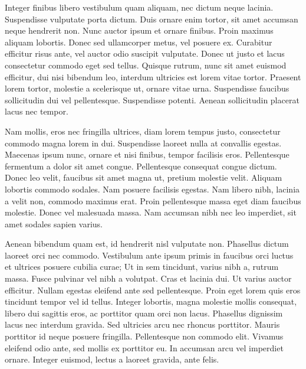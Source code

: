 \documentclass{ltjarticle}
\begin{document}
Integer finibus libero vestibulum quam aliquam, nec dictum neque lacinia. Suspendisse vulputate porta dictum. Duis ornare enim tortor, sit amet accumsan neque hendrerit non. Nunc auctor ipsum et ornare finibus. Proin maximus aliquam lobortis. Donec sed ullamcorper metus, vel posuere ex. Curabitur efficitur risus ante, vel auctor odio suscipit vulputate. Donec ut justo et lacus consectetur commodo eget sed tellus. Quisque rutrum, nunc sit amet euismod efficitur, dui nisi bibendum leo, interdum ultricies est lorem vitae tortor. Praesent lorem tortor, molestie a scelerisque ut, ornare vitae urna. Suspendisse faucibus sollicitudin dui vel pellentesque. Suspendisse potenti. Aenean sollicitudin placerat lacus nec tempor.

Nam mollis, eros nec fringilla ultrices, diam lorem tempus justo, consectetur commodo magna lorem in dui. Suspendisse laoreet nulla at convallis egestas. Maecenas ipsum nunc, ornare et nisi finibus, tempor facilisis eros. Pellentesque fermentum a dolor sit amet congue. Pellentesque consequat congue dictum. Donec leo velit, faucibus sit amet magna ut, pretium molestie velit. Aliquam lobortis commodo sodales. Nam posuere facilisis egestas. Nam libero nibh, lacinia a velit non, commodo maximus erat. Proin pellentesque massa eget diam faucibus molestie. Donec vel malesuada massa. Nam accumsan nibh nec leo imperdiet, sit amet sodales sapien varius.

Aenean bibendum quam est, id hendrerit nisl vulputate non. Phasellus dictum laoreet orci nec commodo. Vestibulum ante ipsum primis in faucibus orci luctus et ultrices posuere cubilia curae; Ut in sem tincidunt, varius nibh a, rutrum massa. Fusce pulvinar vel nibh a volutpat. Cras et lacinia dui. Ut varius auctor efficitur. Nullam egestas eleifend ante sed pellentesque. Proin eget lorem quis eros tincidunt tempor vel id tellus. Integer lobortis, magna molestie mollis consequat, libero dui sagittis eros, ac porttitor quam orci non lacus. Phasellus dignissim lacus nec interdum gravida. Sed ultricies arcu nec rhoncus porttitor. Mauris porttitor id neque posuere fringilla. Pellentesque non commodo elit. Vivamus eleifend odio ante, sed mollis ex porttitor eu. In accumsan arcu vel imperdiet ornare. Integer euismod, lectus a laoreet gravida, ante felis. 


\end{document}

